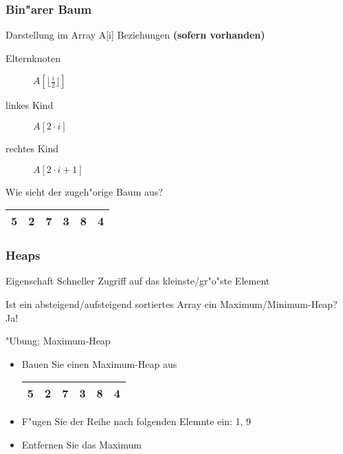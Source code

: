 \documentclass{beamer}
\begin{document}
\begin{frame}
\frametitle{Bin"arer Baum}

\begin{block}{Darstellung im Array A[i]}
Beziehungen \textbf{(sofern vorhanden)}
\pause
\begin{description}
\item[Elternknoten] $A[\lfloor\frac{i}{2}\rfloor]$
\item[linkes Kind] $A[2 \cdot i]$
\item[rechtes Kind] $A[2 \cdot i + 1]$
\end{description}
\end{block}

\pause

\begin{exampleblock}{Wie sieht der zugeh"orige Baum aus?}
\begin{tabular}{ | c | c | c | c | c | c | }
\hline
5 & 2 & 7 & 3 & 8 & 4\\
\hline
\end{tabular}
\end{exampleblock}
\end{frame}


\begin{frame}
\frametitle{Heaps}
\begin{block}{Eigenschaft}
Schneller Zugriff auf das kleinste/gr"o"ste Element
\end{block}

\pause

\begin{alertblock}{Ist ein absteigend/aufsteigend sortiertes Array ein Maximum/Minimum-Heap?}
\pause
Ja!
\end{alertblock}

\pause

\begin{exampleblock}{"Ubung: Maximum-Heap}
\begin{itemize}
\item Bauen Sie einen Maximum-Heap aus
\begin{tabular}{ | c | c | c | c | c | c | }
\hline
5 & 2 & 7 & 3 & 8 & 4\\
\hline
\end{tabular}

\pause

\item F"ugen Sie der Reihe nach folgenden Elemnte ein: 1, 9

\pause

\item Entfernen Sie das Maximum
\end{itemize}
\end{exampleblock}
\end{frame}
\end{document}
